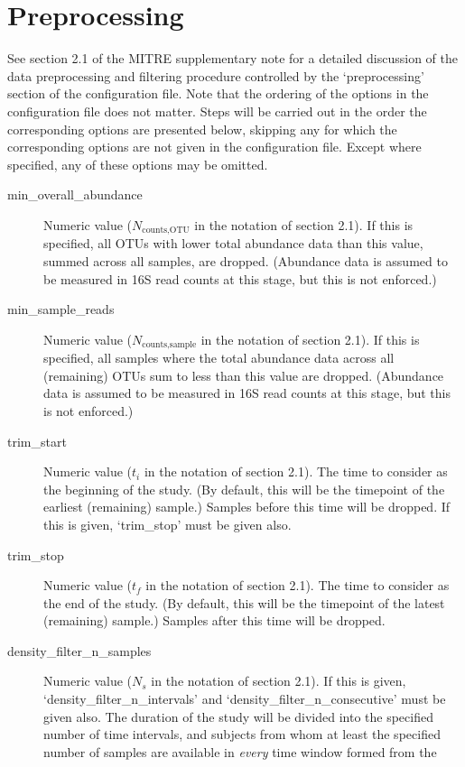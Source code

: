 \documentclass[12pt]{report}
\begin{document}
\section{Preprocessing}\label{preprocessing}
See section 2.1 of the MITRE supplementary note for a detailed
discussion of the data preprocessing and filtering procedure
controlled by the `preprocessing' section of the configuration
file. Note that the ordering of the options in the configuration file
does not matter.  Steps will be carried out in the order the
corresponding options are presented below, skipping any for which the
corresponding options are not given in the configuration file. Except
where specified, any of these options may be omitted.

\begin{description}
\item[min\_overall\_abundance] Numeric value ($N_\text{counts,OTU}$ in
  the notation of section 2.1). If this is specified, all OTUs with
  lower total abundance data than this value, summed across all
  samples, are dropped. (Abundance data is assumed to be measured in
  16S read counts at this stage, but this is not enforced.)
\item[min\_sample\_reads] Numeric value ($N_\text{counts,sample}$ in
  the notation of section 2.1). If this is specified, all samples
  where the total abundance data across all (remaining) OTUs sum to
  less than this value are dropped. (Abundance data is assumed to be
  measured in 16S read counts at this stage, but this is not
  enforced.)
\item[trim\_start] Numeric value ($t_i$ in the notation of section
  2.1). The time to consider as the beginning of the study. (By
  default, this will be the timepoint of the earliest (remaining)
  sample.) Samples before this time will be dropped. If this is given,
  `trim\_stop' must be given also.
\item[trim\_stop] Numeric value ($t_f$ in the notation of section
  2.1). The time to consider as the end of the study. (By
  default, this will be the timepoint of the latest (remaining)
  sample.) Samples after this time will be dropped.
\item[density\_filter\_n\_samples] Numeric value ($N_s$ in the
  notation of section 2.1). If this is given,
  `density\_filter\_n\_intervals' and
  `density\_filter\_n\_consecutive' must be given also. The duration
  of the study will be divided into the specified number of time
  intervals, and subjects from whom at least the specified number of
  samples are available in \textit{every} time window formed from the

\end{description}
\end{document}
